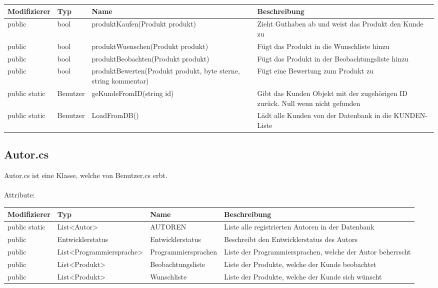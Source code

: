 \begin{tabular}[h]{l|l|p{6cm}|p{6cm}}
Modifizierer & Typ & Name & Beschreibung\\
\hline
public & bool & produktKaufen(Produkt produkt) & Zieht Guthaben ab und weist das Produkt den Kunde zu\\
\hline
public & bool & produktWuenschen(Produkt produkt) & Fügt das Produkt in die Wunschliste hinzu\\
\hline
public & bool & produktBeobachten(Produkt produkt) & Fügt das Produkt in der Beobachtungsliste hinzu\\
\hline
public & bool & produktBewerten(Produkt produkt, byte sterne, string kommentar) & Fügt eine Bewertung zum Produkt zu\\
\hline
public static & Benutzer & geKundeFromID(string id) & Gibt das Kunden Objekt mit der zugehörigen ID zurück. Null wenn nicht gefunden\\
\hline
public static & Benutzer & LoadFromDB() & Lädt alle Kunden von der Datenbank in die KUNDEN-Liste\\
\end{tabular}

\newpage

\subsection{Autor.cs}
Autor.cs ist eine Klasse, welche von Benutzer.cs erbt.\\
\\
Attribute:\\

\begin{tabular}[h]{l|l|l|p{5.3cm}}
Modifizierer & Typ & Name & Beschreibung\\
\hline
public static & List<Autor> & AUTOREN & Liste alle registrierten Autoren in der Datenbank\\
\hline
public & Entwicklerstatus & Entwicklerstatus & Beschreibt den Entwicklerstatus des Autors\\
\hline
public & List<Programmiersprache> & Programmiersprachen & Liste der Programmiersprachen, welche der Autor beherrscht\\
\hline
public & List<Produkt> & Beobachtungsliste & Liste der Produkte, welche der Kunde beobachtet\\
\hline
public & List<Produkt> & Wunschliste & Liste der Produkte, welche der Kunde sich wünscht\\
\end{tabular}\newline \break

